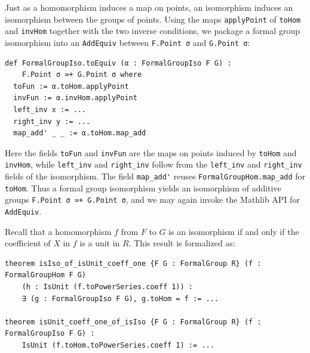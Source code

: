 Just as a homomorphism induces a map on points, an isomorphism induces an
isomorphism between the groups of points.  Using the maps
\lstinline|applyPoint| of \lstinline|toHom| and \lstinline|invHom|
together with the two inverse conditions, we package a formal group
isomorphism into an \lstinline|AddEquiv| between \lstinline|F.Point σ|
and \lstinline|G.Point σ|:

\begin{lstlisting}
def FormalGroupIso.toEquiv (α : FormalGroupIso F G) :
    F.Point σ ≃+ G.Point σ where
  toFun := α.toHom.applyPoint
  invFun := α.invHom.applyPoint
  left_inv x := ...
  right_inv y := ...
  map_add' _ _ := α.toHom.map_add
\end{lstlisting}

Here the fields \lstinline|toFun| and \lstinline|invFun| are the maps on
points induced by \lstinline|toHom| and \lstinline|invHom|, while
\lstinline|left_inv| and \lstinline|right_inv| follow from the
\lstinline|left_inv| and \lstinline|right_inv| fields of the
isomorphism.  The field \lstinline|map_add'| reuses
\lstinline|FormalGroupHom.map_add| for \lstinline|toHom|.  Thus a formal
group isomorphism yields an isomorphism of additive groups
\lstinline|F.Point σ ≃+ G.Point σ|, and we may again invoke the Mathlib
API for \lstinline|AddEquiv|.


Recall that a homomorphism $f$ from $F$ to $G$ is an isomorphism if and only
if the coefficient of $X$ in $f$ is a unit in $R$. This result is formalized
as:

\begin{lstlisting}
theorem isIso_of_isUnit_coeff_one {F G : FormalGroup R} (f : FormalGroupHom F G)
    (h : IsUnit (f.toPowerSeries.coeff 1)) :
    ∃ (g : FormalGroupIso F G), g.toHom = f := ...

theorem isUnit_coeff_one_of_isIso {F G : FormalGroup R} (f : FormalGroupIso F G) :
    IsUnit (f.toHom.toPowerSeries.coeff 1) := ...
\end{lstlisting}

